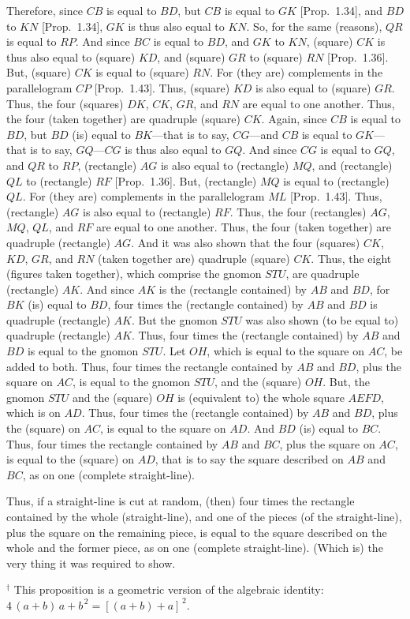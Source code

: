 \begin{Parallel}{}{}
{Therefore, since $CB$ is equal to $BD$, but $CB$ is equal to $GK$ [Prop.~1.34], and $BD$ to
$KN$ [Prop.~1.34], $GK$ is thus also equal to $KN$. So, for the same (reasons), $QR$ is equal
to $RP$. And since $BC$ is equal to $BD$, and $GK$ to $KN$, (square) $CK$ is thus
also equal to (square) $KD$, and (square) $GR$ to (square) $RN$ [Prop.~1.36]. But,
(square) $CK$ is equal to (square) $RN$. For (they are) complements
in the parallelogram $CP$ [Prop.~1.43]. Thus, (square) $KD$ is also equal
to (square) $GR$. Thus, the four (squares)
$DK$, $CK$, $GR$, and $RN$ are equal to one another. Thus, the four (taken
together) are quadruple (square) $CK$. Again, since $CB$ is equal to $BD$, but
$BD$ (is) equal to $BK$---that is to say, $CG$---and $CB$ is equal to $GK$---that is
to say, $GQ$---$CG$ is thus also equal to $GQ$. And since
$CG$ is equal to $GQ$, and $QR$ to $RP$, (rectangle) $AG$ is also equal to
(rectangle) $MQ$, and (rectangle) $QL$ to (rectangle) $RF$ [Prop.~1.36]. But, (rectangle)
$MQ$ is equal to (rectangle) $QL$. For (they are) complements in the parallelogram $ML$ [Prop.~1.43]. Thus, 
(rectangle) $AG$ is also equal  to (rectangle) $RF$. Thus, the four (rectangles) $AG$, $MQ$, $QL$, and $RF$ are equal
to one another. Thus, the four (taken together)
 are quadruple (rectangle)
$AG$. And it was also shown that the four (squares)
$CK$, $KD$, $GR$, and $RN$ (taken together are) quadruple (square) $CK$. 
Thus, the eight (figures taken together), which comprise the gnomon $STU$,
are quadruple (rectangle) $AK$. And since $AK$ is the (rectangle contained)
by $AB$ and $BD$, for $BK$ (is) equal to $BD$, four times the (rectangle contained)
by $AB$ and $BD$ is quadruple (rectangle) $AK$. But the gnomon $STU$ was also shown (to be equal to) quadruple (rectangle)
$AK$. Thus, four times the
(rectangle contained) by $AB$ and $BD$ is equal to the gnomon $STU$. 
Let $OH$, which is equal to the square on $AC$,  be added to both.  
Thus, four times  the
rectangle contained by $AB$ and $BD$, plus the square on $AC$, is equal to
the gnomon $STU$, and the (square) $OH$. But, the  gnomon $STU$
and the (square) $OH$ is (equivalent to) the whole square $AEFD$, which is on
$AD$. Thus, four times the (rectangle contained) by $AB$ and $BD$, plus
the (square) on $AC$, is equal to the square on $AD$.
And $BD$ (is) equal to $BC$. Thus, four times the rectangle contained by $AB$ and $BC$, plus the square on $AC$, is equal to the (square) on $AD$, that is to
say the square described on $AB$ and $BC$,  as on one (complete straight-line).

Thus, if a straight-line is cut at random, (then) four times the rectangle contained
by the whole (straight-line), and one of the pieces (of the straight-line), plus the square on the remaining piece,
is equal to  the square described on the whole and the former piece, as
on one (complete straight-line). (Which is) the very thing it was required to show.}
\end{Parallel}
{\footnotesize \noindent$^\dag$ This proposition is a geometric version
of the algebraic identity: $4\,(a+b)\,a+b^{\,2} = \left[(a+b)+a\right]^{\,2}$.}

